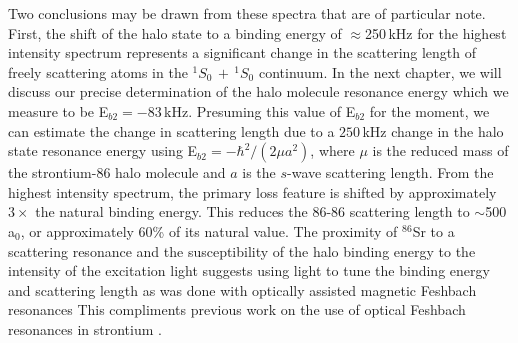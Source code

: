 Two conclusions may be drawn from these spectra that are of particular note.
First, the shift of the halo state to a binding energy of $\approx$250\,kHz for the highest intensity spectrum represents a significant change in the scattering length of freely scattering atoms in the $^1S_0\,+\,^1S_0$ continuum.
In the next chapter, we will discuss our precise determination of the halo molecule resonance energy which we measure to be E$_{b2}=-83$\,kHz.
Presuming this value of E$_{b2}$ for the moment, we can estimate the change in scattering length due to a $250$\,kHz change in the halo state resonance energy using E$_{b2}=-\hbar^2/(2 \mu a^2)$, where $\mu$ is the reduced mass of the strontium-86 halo molecule and $a$ is the $s$-wave scattering length.
From the highest intensity spectrum, the primary loss feature is shifted by approximately $3\times$ the natural binding energy.
This reduces the $86$-$86$ scattering length to $\sim$500\,a$_0$, or approximately $60$\% of its natural value.
The proximity of $^{86}$Sr to a scattering resonance and the susceptibility of the halo binding energy to the intensity of the excitation light suggests using light to tune the binding energy and scattering length as was done with optically assisted magnetic Feshbach resonances \cite{blv09,chx15}
This compliments previous work on the use of optical Feshbach resonances in strontium \cite{fks96,Theis2004,Yamazaki2010,Blatt,Yan2013c}. 

